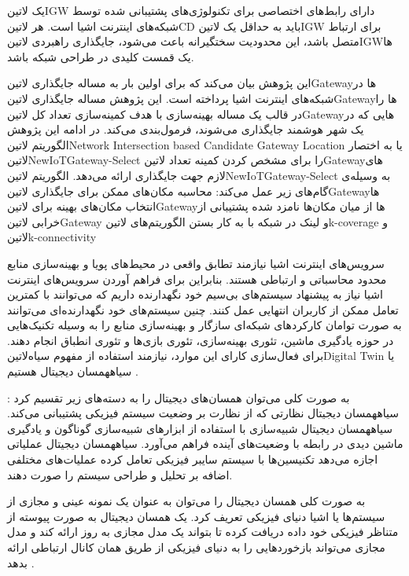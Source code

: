 یک ‌لاتین{IGW} دارای رابط‌های اختصاصی برای تکنولوژی‌های پشتیبانی شده توسط شبکه‌های اینترنت اشیا است.
هر ‌لاتین{CD} باید به حداقل یک ‌لاتین{IGW} برای ارتباط متصل باشد، این محدودیت سختگیرانه باعث می‌شود، جایگذاری راهبردی ‌لاتین{IGW}ها یک قمست کلیدی
در طراحی شبکه باشد.

این پژوهش بیان می‌کند که برای اولین بار به مساله جایگذاری ‌لاتین{Gateway}ها در شبکه‌های اینترنت اشیا پرداخته است.
این پژوهش مساله جایگذاری ‌لاتین{Gateway}ها را در قالب یک مساله بهینه‌سازی با هدف کمینه‌سازی تعداد کل ‌لاتین{Gateway}هایی که در یک شهر هوشمند
جایگذاری می‌شوند، فرمول‌بندی می‌کند.
در ادامه این پژوهش الگوریتم ‌لاتین{Network Intersection based Candidate Gateway Location}
یا به اختصار ‌لاتین{NewIoTGateway-Select} را برای مشخص کردن کمینه تعداد ‌لاتین{Gateway}های لازم جهت جایگذاری ارائه می‌دهد.
الگوریتم ‌لاتین{NewIoTGateway-Select} به وسیله‌ی گام‌های زیر عمل می‌کند:
 محاسبه مکان‌های ممکن برای جایگذاری ‌لاتین{Gateway}ها
 انتخاب مکان‌های بهینه برای ‌لاتین{Gateway}ها از میان مکان‌ها نامزد شده
 پشتیبانی از خرابی ‌لاتین{Gateway} و لینک در شبکه با به کار بستن الگوریتم‌های ‌لاتین{k-coverage} و ‌لاتین{k-connectivity}


سرویس‌های اینترنت اشیا نیازمند تطابق واقعی در محیط‌های پویا و بهینه‌سازی منابع محدود محاسباتی و ارتباطی هستند.
بنابراین برای فراهم آوردن سرویس‌های اینترنت اشیا نیاز به پیشنهاد سیستم‌های بی‌سیم خود نگهدارنده داریم که می‌توانند با کمترین
تعامل ممکن از کاربران انتهایی عمل کنند. چنین سیستم‌های خود نگهدارنده‌ای می‌توانند به صورت توامان کارکردهای شبکه‌ای سازگار و
بهینه‌سازی منابع را به وسیله تکنیک‌هایی در حوزه یادگیری ماشین، تئوری بهینه‌سازی، تئوری بازی‌ها و تئوری انطباق انجام دهند.
برای فعال‌سازی کارای این موارد، نیازمند استفاده از مفهوم ‌سیاه{‌لاتین{Digital Twin}} یا ‌سیاه{همسان دیجیتال} هستیم
.

به صورت کلی می‌توان همسان‌های دیجیتال را به دسته‌های زیر تقسیم کرد :
 ‌سیاه{همسان دیجیتال نظارتی} که از نظارت بر وضعیت سیستم فیزیکی پشتیبانی می‌کند.
 ‌سیاه{همسان دیجیتال شبیه‌سازی} با استفاده از ابزارهای شبیه‌سازی گوناگون و یادگیری ماشین دیدی در رابطه با وضعیت‌های آینده فراهم می‌آورد.
 ‌سیاه{همسان دیجیتال عملیاتی} اجازه می‌دهد تکنیسین‌ها با سیستم سایبر فیزیکی تعامل کرده عملیات‌های مختلفی اضافه بر تحلیل و طراحی سیستم را صورت دهند.

به صورت کلی همسان دیجیتال را می‌توان به عنوان یک نمونه عینی و مجازی از سیستم‌ها یا اشیا دنیای فیزیکی تعریف کرد.
یک همسان دیجیتال به صورت پیوسته از متناظر فیزیکی خود داده دریافت کرده تا بتواند یک مدل مجازی به روز ارائه کند و مدل مجازی
می‌تواند بازخوردهایی را به دنیای فیزیکی از طریق همان کانال ارتباطی ارائه بدهد
.

